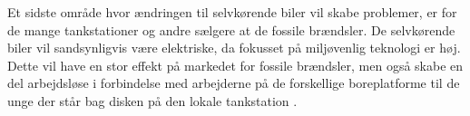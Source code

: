Et sidste område hvor ændringen til selvkørende biler vil skabe problemer, er for de mange tankstationer og andre sælgere at de fossile brændsler. De selvkørende biler vil sandsynligvis være elektriske, da fokusset på miljøvenlig teknologi er høj. Dette vil have en stor effekt på markedet for fossile brændsler, men også skabe en del arbejdsløse i forbindelse med arbejderne på de forskellige boreplatforme til de unge der står bag disken på den lokale tankstation \cite{GAS}.
